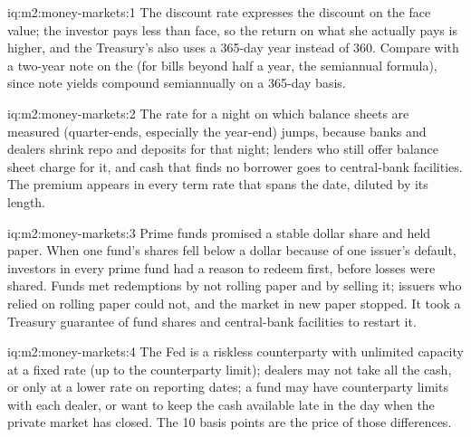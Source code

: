 \begin{solution}{iq:m2:money-markets:1}
The discount rate expresses the discount on the face value; the investor pays
less than face, so the return on what she actually pays is higher, and the
Treasury's  also uses a 365-day year instead of 360.
Compare with a two-year note on the  (for bills beyond
half a year, the semiannual formula), since note yields compound
semiannually on a 365-day basis.
\end{solution}

\begin{solution}{iq:m2:money-markets:2}
The rate for a night on which balance sheets are measured (quarter-ends,
especially the year-end) jumps, because banks and dealers shrink repo and
deposits for that night; lenders who still offer balance sheet charge for it,
and cash that finds no borrower goes to central-bank facilities. The premium
appears in every term rate that spans the date, diluted by its length.
\end{solution}

\begin{solution}{iq:m2:money-markets:3}
Prime funds promised a stable dollar share and held paper. When one fund's
shares fell below a dollar because of one issuer's default, investors in
every prime fund had a reason to redeem first, before losses were shared.
Funds met redemptions by not rolling paper and by selling it; issuers who
relied on rolling paper could not, and the market in new paper stopped. It
took a Treasury guarantee of fund shares and central-bank facilities to
restart it.
\end{solution}

\begin{solution}{iq:m2:money-markets:4}
The Fed is a riskless counterparty with unlimited capacity at a fixed rate
(up to the counterparty limit); dealers may not take all the cash, or only at
a lower rate on reporting dates; a fund may have counterparty limits with
each dealer, or want to keep the cash available late in the day when the
private market has closed. The 10 basis points are the price of those
differences.
\end{solution}

